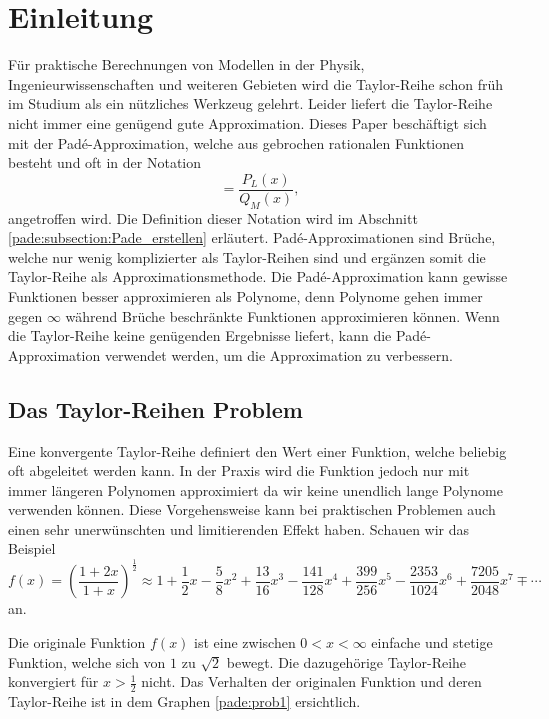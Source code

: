 %
%
%
\section{Einleitung\label{pade:section:einleitung}}
Für praktische Berechnungen von Modellen in der Physik, Ingenieurwissenschaften und weiteren Gebieten wird die Taylor-Reihe schon früh im Studium als ein nützliches Werkzeug gelehrt.
Leider liefert die Taylor-Reihe nicht immer eine genügend gute Approximation.
Dieses Paper beschäftigt sich mit der Padé-Approximation, welche aus gebrochen rationalen Funktionen besteht und oft in der Notation
\begin{equation*}
[L/M]
=
\frac{P_{L}(x)}{Q_{M}(x)},
\end{equation*}
angetroffen wird. 
Die Definition dieser Notation wird im Abschnitt \ref{pade:subsection:Pade_erstellen} erläutert.
Padé-Approximationen sind Brüche, welche nur wenig komplizierter als Taylor-Reihen sind und ergänzen somit die Taylor-Reihe als Approximationsmethode.
Die Padé-Approximation kann gewisse Funktionen besser approximieren als Polynome, denn Polynome gehen immer gegen $\infty$ während Brüche beschränkte Funktionen approximieren können.
Wenn die Taylor-Reihe keine genügenden Ergebnisse liefert, kann die Padé-Approximation verwendet werden, um die Approximation zu verbessern.

 

\subsection{Das Taylor-Reihen Problem
\label{pade:Taylorfehler}}

Eine konvergente Taylor-Reihe definiert den Wert einer Funktion, welche beliebig oft abgeleitet werden kann. 
In der Praxis wird die Funktion jedoch nur mit immer längeren Polynomen approximiert da wir keine unendlich lange Polynome verwenden können.
Diese Vorgehensweise kann bei praktischen Problemen auch einen sehr unerwünschten und limitierenden Effekt haben. 
Schauen wir das Beispiel 
\begin{equation*}
f(x)
=
\left(\frac{1+2x}{1+x}\right)^{\frac{1}{2}}
\approx
1+\frac{1}{2}x - \frac{5}{8}x^2+\frac{13}{16}x^3 -\frac{141}{128}x^4 +\frac{399}{256}x^5 - \frac{2353}{1024}x^6 + \frac{7205}{2048}x^7 \mp \cdots
\end{equation*}
an. 

Die originale Funktion $f(x)$ ist eine zwischen $0<x<\infty$ einfache und stetige Funktion, welche sich von $1$ zu $\sqrt{2}$ bewegt.
Die dazugehörige Taylor-Reihe konvergiert für $x>\frac{1}{2}$ nicht. 
Das Verhalten der originalen Funktion und deren Taylor-Reihe ist in dem Graphen \ref{pade:prob1} ersichtlich. 

